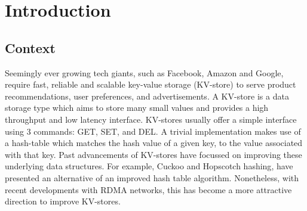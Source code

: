 

\chapter{Introduction}








\section{Context}
Seemingly ever growing tech giants, such as Facebook, Amazon and Google, require fast, reliable and scalable key-value storage (KV-store) to serve product recommendations, user preferences, and advertisements.
A KV-store is a data storage type which aims to store many small values and provides a high throughput and low latency interface.
KV-stores usually offer a simple interface using 3 commands: GET, SET, and DEL. A trivial implementation makes use of a hash-table which matches the hash value of a given key, to the value associated with that key.
Past advancements of KV-stores have focussed on improving these underlying data structures.
For example, Cuckoo and Hopscotch hashing\cite{geambasu2010comet}, have presented an alternative of an improved hash table algorithm.
Nonetheless, with recent developments with RDMA networks, this has become a more attractive direction to improve KV-stores.

